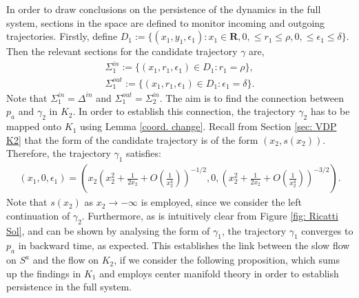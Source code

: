 In order to draw conclusions on the persistence of the dynamics in the full system, sections in the space are defined to monitor incoming and outgoing trajectories.
Firstly, define
$D_1:= \{ (x_1,y_1,\epsilon_1): x_1 \in \mathbf{R}, 0, \leq r_1 \leq \rho, 0, \leq\epsilon_1 \leq \delta\}$.
Then the relevant sections for the candidate trajectory $\gamma$ are,
\begin{align*}
\Sigma^{in}_1 := \{ (x_1,r_1, \epsilon_1) \in D_1 : r_1 = \rho \}, \\
\Sigma^{out}_1 := \{ (x_1,r_1, \epsilon_1) \in D_1 : \epsilon_1=\delta \}.
\end{align*}
Note that $\Sigma^{in}_1 = \Delta^{in}$ and $\Sigma^{out}_1=\Sigma^{in}_2$.
The aim is to find the connection between $p_a$ and $\gamma_2$ in $K_2$. In order to establish this connection, the trajectory $\gamma_2$ has to be mapped onto $K_1$ using Lemma \ref{coord. change}. Recall from Section \ref{sec: VDP K2} that the form of the candidate trajectory is of the form $(x_2, s(x_2))$.
Therefore, the trajectory $\gamma_1$ satisfies:
\begin{align*}
(x_1, 0, \epsilon_1) = \left(x_2 \left(x_2^2 + \frac{1}{2x_2} + O\left(\frac{1}{x_2^4} \right) \right)^{-1/2}, 0, \left(x_2^2 + \frac{1}{2x_2} + O\left(\frac{1}{x_2^4} \right)\right)^{-3/2} \right).
\end{align*}
Note that $s(x_2)$ as $x_2 \to - \infty$ is employed, since we consider the left continuation of $\gamma_2$.
Furthermore, as is intuitively clear from Figure \ref{fig: Ricatti Sol}, and can be shown by analysing the form of $\gamma_1$, the trajectory $\gamma_1$ converges to $p_a$ in backward time, as expected.
This establishes the link between the slow flow on $S^a$ and the flow on $K_2$, if we consider the following proposition, which sums up the findings in $K_1$ and employs center manifold theory in order to establish persistence in the full system.
